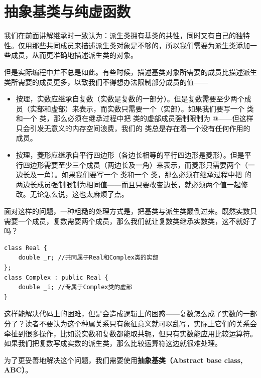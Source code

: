 \section{抽象基类与纯虚函数}
我们在前面讲解继承时一致认为：派生类拥有基类的共性，同时又有自己的独特性。仅用那些共同成员来描述派生类对象是不够的，所以我们需要为派生类添加一些成员，从而更准确地描述派生类的对象。\par
但是实际编程中并不总是如此。有些时候，描述基类对象所需要的成员比描述派生类所需要的成员更多，以致我们不得想办法限制部分成员的值——
\begin{itemize}
    \item 按理，实数应继承自复数（实数是复数的一部分）。但是复数需要至少两个成员（实部和虚部）来表示，而实数只需要一个（实部）。如果我们要写一个 \lstinline@Complex@ 类和一个 \lstinline@Real@ 类，那么必须在继承过程中把 \lstinline@Complex@ 类的虚部成员强制限制为 @——但这样只会引发无意义的内存空间浪费，我们的 \lstinline@Real@ 类总是存在着一个没有任何作用的成员。
    \item 按理，菱形应继承自平行四边形（各边长相等的平行四边形是菱形）。但是平行四边形需要至少三个成员（两边长及一角）来表示，而菱形只需要两个（一边长及一角）。如果我们要写一个 \lstinline@Parallelogram@ 类和一个 \lstinline@Rhombus@ 类，那么必须在继承过程中把 \lstinline@Parallelogram@ 的两边长成员强制限制为相同值——而且只要改变边长，就必须两个值一起修改。无论怎么说，这也太麻烦了点。
\end{itemize}
面对这样的问题，一种粗糙的处理方式是，把基类与派生类巅倒过来。既然实数只需要一个成员，复数需要两个成员，那么我们就让复数类继承实数类，这不就好了吗？
\begin{lstlisting}
class Real {
    double _r; //共同属于Real和Complex类的实部
};
class Complex : public Real {
    double _i; //专属于Complex类的虚部
}
\end{lstlisting}
这样能解决代码上的困难，但是会造成逻辑上的困惑——复数怎么成了实数的一部分了？读者不要认为这个种属关系只有象征意义就可以乱写，实际上它们的关系会牵扯到很多操作，比如说实数和复数都能取共轭，但只有实数能应用比较运算符。如果我们把复数写成实数的派生类，那么比较运算符这边就很难处理。\par
为了更妥善地解决这个问题，我们需要使用\textbf{抽象基类（Abstract base class, ABC）}。
